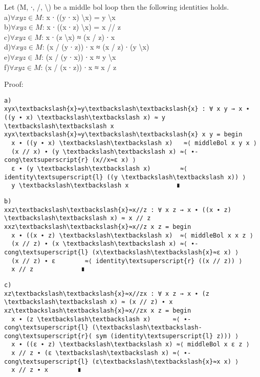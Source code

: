 Let (M, ∙, /, \textbackslash ) be a middle bol loop then the following identities holds.\\
a)\(\forall x y z \in M\): x ∙ ((y ∙ x) \textbackslash x) = y \textbackslash x \\
b)\(\forall x y z \in M\): x ∙ ((x ∙ z) \textbackslash x) = x // z\\
c)\(\forall x y z \in M\): x ∙ (z \textbackslash x) ≈ (x / z) ∙ x\\
d)\(\forall x y z \in M\): (x / (y ∙ z)) ∙ x ≈ (x / z) ∙ (y \textbackslash x)\\
e)\(\forall x y z \in M\): (x / (y ∙ x)) ∙ x ≈ y \textbackslash x\\
f)\(\forall x y z \in M\): (x / (x ∙ z)) ∙ x ≈ x / z

Proof:
\begin{Verbatim}[commandchars=\\\{\},samepage=true]
a)
xyx\textbackslash{x}≈y\textbackslash\textbackslash{x} : ∀ x y → x ∙ ((y ∙ x) \textbackslash\textbackslash x) ≈ y \textbackslash\textbackslash x
xyx\textbackslash{x}≈y\textbackslash\textbackslash{x} x y = begin
  x ∙ ((y ∙ x) \textbackslash\textbackslash x)   ≈⟨ middleBol x y x ⟩
  (x // x) ∙ (y \textbackslash\textbackslash x) ≈⟨ ∙-cong\textsuperscript{r} (x//x≈ε x) ⟩
  ε ∙ (y \textbackslash\textbackslash x)        ≈⟨ identity\textsuperscript{l} ((y \textbackslash\textbackslash x)) ⟩
  y \textbackslash\textbackslash x             ∎
\end{Verbatim}

\begin{Verbatim}[commandchars=\\\{\},samepage=true]
b)
xxz\textbackslash\textbackslash{x}≈x//z : ∀ x z → x ∙ ((x ∙ z) \textbackslash\textbackslash x) ≈ x // z
xxz\textbackslash\textbackslash{x}≈x//z x z = begin
  x ∙ ((x ∙ z) \textbackslash\textbackslash x)  ≈⟨ middleBol x x z ⟩
  (x // z) ∙ (x \textbackslash\textbackslash x) ≈⟨ ∙-cong\textsuperscript{l} (x\textbackslash\textbackslash{x}≈ε x) ⟩
  (x // z) ∙ ε        ≈⟨ identity\textsuperscript{r} ((x // z)) ⟩
  x // z             ∎
\end{Verbatim}

\begin{Verbatim}[commandchars=\\\{\},samepage=true]
c)
xz\textbackslash\textbackslash{x}≈x//zx : ∀ x z → x ∙ (z \textbackslash\textbackslash x) ≈ (x // z) ∙ x
xz\textbackslash\textbackslash{x}≈x//zx x z = begin
  x ∙ (z \textbackslash\textbackslash x)      ≈⟨ ∙-cong\textsuperscript{l} (\textbackslash\textbackslash-cong\textsuperscript{r}( sym (identity\textsuperscript{l} z))) ⟩
  x ∙ ((ε ∙ z) \textbackslash\textbackslash x) ≈⟨ middleBol x ε z ⟩
  x // z ∙ (ε \textbackslash\textbackslash x) ≈⟨ ∙-cong\textsuperscript{l} (ε\textbackslash\textbackslash{x}≈x x) ⟩
  x // z ∙ x        ∎
\end{Verbatim}

